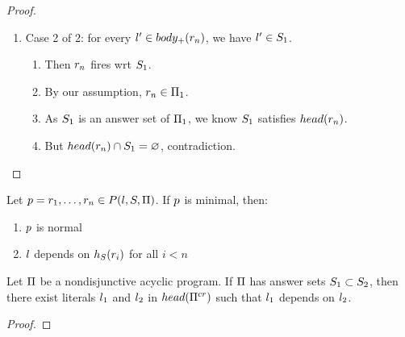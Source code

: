 \documentclass{paper}
\begin{document}
\begin{flushleft}
\begin{proof}
\begin{enumerate}
\begin{enumerate}
\begin{enumerate}
\begin{enumerate}
normal proof of
$\ot\lit$ wrt $\n\lits2$ in $\n\p2$.
\item
Notice $\rku{\ot\lit} < \rku\lit$.
\item
By the induction hypothesis, $\ot\pr$ contains some
${\rl} \in \n\p2 \setd \n\p1$.
\item
So $\pr$ also contains ${\rl}$.
\item
By our assumption, $\rl \in \n\p1 \seti \n\p2$,
contradiction.
\end{enumerate}
\item
Case 2 of 2: for every ${l}' \in body_+({r}_{n})$,
we have ${l}' \in {S}_{1}$.
\begin{enumerate}
\item
Then ${r}_{n}$ fires wrt ${S}_{1}$.
\item
By our assumption, ${r}_{n} \in {\Pi}_{1}$.
\item
As ${S}_{1}$ is an answer set of ${\Pi}_{1}$, we know
${S}_{1}$ satisfies $head({r}_{n})$.
\item
But $head({r}_{n}) \cap {S}_{1} = \varnothing$, contradiction.
\end{enumerate}
\end{enumerate}
\end{enumerate}

\end{enumerate}

\end{proof}

\begin{remark}

Let $p = {r}_{1}, \ldots, {r}_{n} \in P({l}, {S}, {\Pi})$. If
$\pr$ is minimal, then:
\begin{enumerate}
\item
$\pr$ is normal
\item
$l$ depends on $h_S({r}_{i})$ for all $i < n$
\end{enumerate}

\end{remark}

\begin{lemma}
\label{last_lemma}

Let $\Pi$ be a nondisjunctive acyclic \cp{} program.
If $\Pi$ has answer sets ${S}_{1} \subset {S}_{2}$,
then there exist literals ${l}_{1}$ and ${l}_{2}$ in
$head(\Pi^{cr})$ such that
${l}_{1}$ depends on ${l}_{2}$.

\end{lemma}

\begin{proof}


\end{proof}
\end{flushleft}
\end{document}
